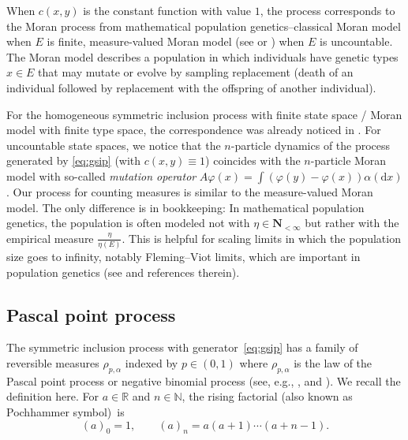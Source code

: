 \documentclass[11pt]{article}
\numberwithin{equation}{section}
\numberwithin{equation}{section}
\newcommand{\N}{\mathbb{N}}
\newcommand{\R}{\mathbb{R}}
\newcommand{\1}{\mathbbm{1}}
\begin{document}
When $c(x,y)$ is the constant function with value $1$, the process corresponds to the Moran process from mathematical population genetics--classical Moran model \cite{TransitionMoran,Moran} when $E$ is finite, measure-valued Moran model (see \cite[Section 2.6]{DawsonMeasureValuedMarkovProcesses} or \cite[Section~5.4]{Etheridge00}) when $E$ is uncountable. The Moran model describes a population in which individuals have genetic types $x\in E$ that may mutate or evolve by sampling replacement (death of an individual followed by replacement with the offspring of another individual).

For the homogeneous symmetric inclusion process with finite state space / Moran model with finite type space, the correspondence was already noticed in \cite[Section~5]{carinci2015dualities}. For uncountable state spaces, we notice that the $n$-particle dynamics of the process generated by \eqref{eq:gsip} (with $c(x,y) \equiv 1$) coincides with the $n$-particle Moran model \cite[equation~(2.5.2)]{DawsonMeasureValuedMarkovProcesses} with so-called \emph{mutation operator} $A\varphi(x) = \int( \varphi(y) - \varphi(x)) \alpha(\mathrm d x)$. Our process for counting measures is similar to the measure-valued Moran model. The only difference is in bookkeeping: In mathematical population genetics, the population is often modeled not with $\eta \in \mathbf N_{<\infty}$ but rather with the empirical measure $\frac{\eta}{\eta(E)}$. This is helpful for scaling limits in which the population size goes to infinity, notably Fleming--Viot limits, which are important in population genetics (see \cite{shigaDiffusions} and references therein).

\subsection{Pascal point process} \label{sec:pascaldef}
The symmetric inclusion process with generator~\eqref{eq:gsip} has a family of reversible measures $\rho_{p,\alpha}$ indexed by $p\in (0,1)$ \cite[Theorem 5.2]{IntertwiningConsistent} where $\rho_{p,\alpha}$ is the law of the Pascal point process or negative binomial process (see, e.g., \cite[Section~2.7]{serfozo1990point}, \cite{kozubowski2008distributional} and \cite[Section~5.2]{IntertwiningConsistent}). We recall the definition here.
For $a\in \R$ and $n\in \N$, the rising factorial (also known as Pochhammer symbol)~is
\[
	(a)_0 = 1,\qquad (a)_n = a(a+1)\cdots (a+n-1).
\]
\end{document}
